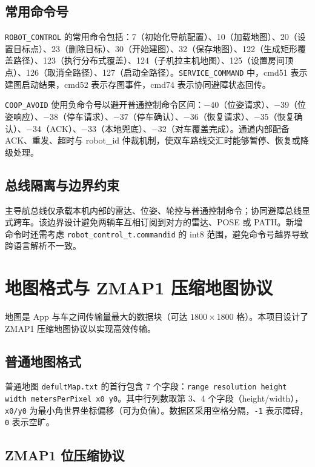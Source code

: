\subsection{常用命令号}
\label{sec:command-ids}

\texttt{ROBOT\_CONTROL} 的常用命令包括：7（初始化导航配置）、10（加载地图）、20（设置目标点）、23（删除目标）、30（开始建图）、32（保存地图）、122（生成矩形覆盖路径）、123（执行分布式覆盖）、124（子机拉主机地图）、125（设置房间顶点）、126（取消全路径）、127（启动全路径）。\texttt{SERVICE\_COMMAND} 中，cmd51 表示建图启动结果，cmd52 表示存图事件，cmd74 表示协同避障状态回传。

\texttt{COOP\_AVOID} 使用负命令号以避开普通控制命令区间：$-$40（位姿请求）、$-$39（位姿响应）、$-$38（停车请求）、$-$37（停车确认）、$-$36（恢复请求）、$-$35（恢复确认）、$-$34（ACK）、$-$33（本地兜底）、$-$32（对车覆盖完成）。通道内部配备 ACK、重发、超时与 robot\_id 仲裁机制，使双车路线交汇时能够暂停、恢复或降级处理。

\subsection{总线隔离与边界约束}
\label{sec:bus-isolation}

主导航总线仅承载本机内部的雷达、位姿、轮控与普通控制命令；协同避障总线显式跨车。该边界设计避免两辆车互相订阅到对方的雷达、POSE 或 PATH。新增命令时还需考虑 \texttt{robot\_control\_t.commandid} 的 int8 范围，避免命令号越界导致跨语言解析不一致。

\section{地图格式与 ZMAP1 压缩地图协议}
\label{sec:zmap1}

地图是 App 与车之间传输量最大的数据块（可达 $1800\times1800$ 格）。本项目设计了 ZMAP1 压缩地图协议以实现高效传输。

\subsection{普通地图格式}
\label{sec:normal-map}

普通地图 \texttt{defultMap.txt} 的首行包含 7 个字段：\texttt{range resolution height width \allowbreak metersPerPixel x0 y0}。其中行列数取第 3、4 个字段（height/width），\texttt{x0/y0} 为最小角世界坐标偏移（可为负值）。数据区采用空格分隔，\texttt{-1} 表示障碍，\texttt{0} 表示空旷。

\subsection{ZMAP1 位压缩协议}
\label{sec:zmap1-protocol}

